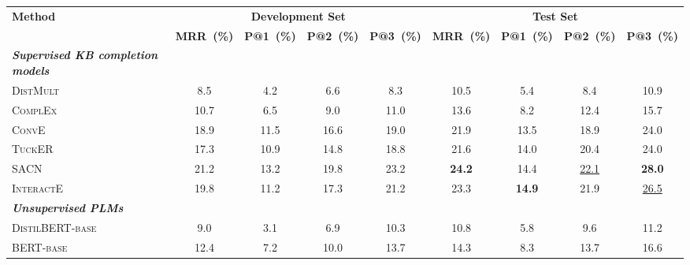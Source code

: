 \begin{table}[t!]
	\centering
	\scriptsize
	\begin{tabular}{l|cccc|cccc}
		\toprule
		\multirow{2}{*}{\textbf{Method}} & \multicolumn{4}{c|}{\textbf{Development Set}} &\multicolumn{4}{c}{\textbf{Test Set}}  \\
		
		&\textbf{MRR~(\%)}   &\textbf{P@1~(\%)}  &\textbf{P@2~(\%)}  &\textbf{P@3~(\%)}  &\textbf{MRR~(\%)}   &\textbf{P@1~(\%)}  &\textbf{P@2~(\%)}  &\textbf{P@3~(\%)}  \\
		\cline{1-9}
		\textbf{\textit{Supervised KB completion models}} & & & & & & & &\\
		\cline{1-9}
		\textsc{DistMult}~\citep{yang2015embedding} &8.5   &4.2  &6.6  &8.3  &10.5   &5.4  &8.4  &10.9  \\
		\textsc{ComplEx}~\citep{complex} &10.7   &6.5  &9.0  &11.0  &13.6   &8.2  &12.4  &15.7  \\
		\textsc{ConvE}~\citep{DBLP:journals/corr/DettmersMSR17} &18.9   &11.5  &16.6  &19.0  &21.9   &13.5  &18.9  &24.0  \\
		\textsc{TuckER}~\citep{balavzevic2019tucker} &17.3   &10.9  &14.8  &18.8  &21.6   &14.0  &20.4  &24.0  \\
		\textsc{SACN}~\citep{shang2019end-to-end} &21.2   &13.2  &19.8  &23.2  &\textbf{24.2} &14.4  &\underline{22.1}  &\textbf{28.0}  \\
		\textsc{InteractE}~\citep{interacte2020} &19.8   &11.2  &17.3  &21.2  &23.3   &\textbf{14.9}  &21.9  &\underline{26.5}  \\
		\midrule
		\textbf{\textit{Unsupervised PLMs}} & & & & & & & &\\
		\cline{1-9}
		\textsc{DistilBERT-base} &9.0 &3.1 &6.9 &10.3 &10.8 &5.8 &9.6 &11.2 \\
		\textsc{BERT-base} &12.4 &7.2 &10.0 &13.7 &14.3 &8.3 &13.7 &16.6 \\

\end{tabular}
\end{table}
